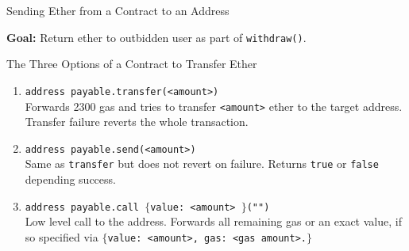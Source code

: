 \documentclass[handout]{beamer}
\begin{document}
\begin{frame}{Sending Ether from a Contract to an Address}

\textbf{Goal:} Return ether to outbidden user as part of \texttt{withdraw()}.


\end{frame}

\begin{frame}{The Three Options of a Contract to Transfer Ether}

\begin{enumerate}
	\item 	\texttt{address payable.transfer(<amount>)}\\
	Forwards 2300 gas and tries to transfer \texttt{<amount>} ether to the target address. Transfer failure reverts the whole transaction.
	\vspace{0.5em}
	\item<2->	\texttt{address payable.send(<amount>)}\\
	Same as \texttt{transfer} but does not revert on failure. Returns \texttt{true} or \texttt{false} depending success.
	\vspace{0.5em}
	\item<3->	\texttt{address payable.call $\{$value: <amount> $\}$("")}\\
	Low level call to the address. Forwards all remaining gas or an exact value, if so specified via \texttt{$\{$value: <amount>, gas: <gas amount>.$\}$}
\end{enumerate}

\vspace{1.5em}

\end{frame}
\end{document}
